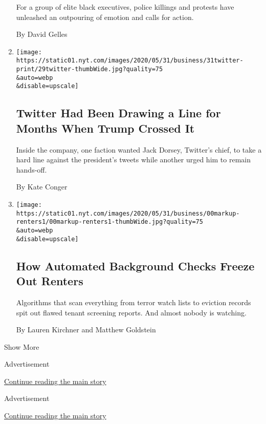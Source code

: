 \begin{enumerate}
  For a group of elite black executives, police killings and protests
  have unleashed an outpouring of emotion and calls for action.

  By David Gelles
\item
  \href{/2020/05/30/technology/twitter-trump-dorsey.html}{}

  \texttt{[image: https://static01.nyt.com/images/2020/05/31/business/31twitter-print/29twitter-thumbWide.jpg?quality=75\\\&auto=webp\\\&disable=upscale]}

  \hypertarget{twitter-had-been-drawing-a-line-for-months-when-trump-crossed-it}{%
  \subsection{Twitter Had Been Drawing a Line for Months When Trump
  Crossed
  It}\label{twitter-had-been-drawing-a-line-for-months-when-trump-crossed-it}}

  Inside the company, one faction wanted Jack Dorsey, Twitter's chief,
  to take a hard line against the president's tweets while another urged
  him to remain hands-off.

  By Kate Conger
\item
  \href{/2020/05/28/business/renters-background-checks.html}{}

  \texttt{[image: https://static01.nyt.com/images/2020/05/31/business/00markup-renters1/00markup-renters1-thumbWide.jpg?quality=75\\\&auto=webp\\\&disable=upscale]}

  \hypertarget{how-automated-background-checks-freeze-out-renters}{%
  \subsection{How Automated Background Checks Freeze Out
  Renters}\label{how-automated-background-checks-freeze-out-renters}}

  Algorithms that scan everything from terror watch lists to eviction
  records spit out flawed tenant screening reports. And almost nobody is
  watching.

  By Lauren Kirchner and Matthew Goldstein
\end{enumerate}

Show More

Advertisement

\protect\hyperlink{after-mid2}{Continue reading the main story}

Advertisement

\protect\hyperlink{after-mktg}{Continue reading the main story}

